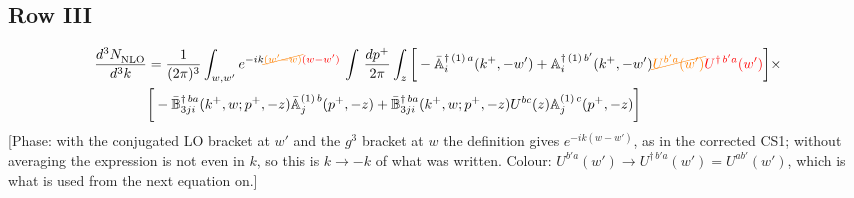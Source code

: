\documentclass[9pt]{article}
\def\mf#1{\mathbb{#1}}
\numberwithin{equation}{section}
\begin{document}
\subsection{Row III\,}
\begin{align}
\frac{d^{3}N_{\rm NLO}^{\rm}}{d^{3}k}  & = \frac{1}{(2\pi)^{3}}  \int_{w, w^\prime} e^{-ik{\color{orange}\cancel{(w^\prime-w)}}{\color{red}(w-w^\prime)}}\, \int\,\frac{dp^{+}}{2\pi} \int_{z} \bigg[-\bar{\mf{A}}^{\dagger\,(1)\,a}_{i}(k^{+},-w^{\prime})+\mf{A}^{\dagger\, (1)\, b^{\prime}}_{i}(k^{+},-w^{\prime}){\color{orange}\cancel{U^{b^{\prime}a}(w^{\prime})}}{\color{red}U^{\dagger\, b^{\prime}a}(w^{\prime})}\bigg]\times \notag \\ &  \bigg[-\Bar{\mf{B}}^{\dagger\, ba}_{3ji}(k^{+}, w; p^{+}, -z)\Bar{\mf{A}}^{(1)\,b}_{j}(p^{+}, - z)+ \Bar{\mf{B}}^{\dagger\, ba}_{3ji}(k^{+},w; p^{+},-z) U^{bc}(z) \mf{A}^{(1)\, c}_{j}(p^{+},- z)\bigg]\nonumber
\end{align} {\color{red}[Phase: with the conjugated LO bracket at $w'$ and the $g^{3}$ bracket at $w$ the definition gives $e^{-ik(w-w')}$, as in the corrected CS1; without averaging the expression is not even in $k$, so this is $k\to-k$ of what was written. Colour: $U^{b'a}(w')\to U^{\dagger\,b'a}(w')=U^{ab'}(w')$, which is what is used from the next equation on.]}
\end{document}
